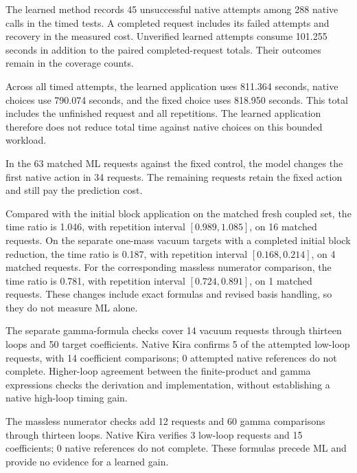 The learned method records 45 unsuccessful native attempts among 288 native calls in the timed tests. A completed request includes its failed attempts and recovery in the measured cost. Unverified learned attempts consume 101.255 seconds in addition to the paired completed-request totals. Their outcomes remain in the coverage counts.

Across all timed attempts, the learned application uses 811.364 seconds, native choices use 790.074 seconds, and the fixed choice uses 818.950 seconds. This total includes the unfinished request and all repetitions. The learned application therefore does not reduce total time against native choices on this bounded workload.

In the 63 matched ML requests against the fixed control, the model changes the first native action in 34 requests. The remaining requests retain the fixed action and still pay the prediction cost.

Compared with the initial block application on the matched fresh coupled set, the time ratio is 1.046, with repetition interval $[0.989,1.085]$, on 16 matched requests. On the separate one-mass vacuum targets with a completed initial block reduction, the time ratio is 0.187, with repetition interval $[0.168,0.214]$, on 4 matched requests. For the corresponding massless numerator comparison, the time ratio is 0.781, with repetition interval $[0.724,0.891]$, on 1 matched requests. These changes include exact formulas and revised basis handling, so they do not measure ML alone.

The separate gamma-formula checks cover 14 vacuum requests through thirteen loops and 50 target coefficients. Native Kira confirms 5 of the attempted low-loop requests, with 14 coefficient comparisons; 0 attempted native references do not complete. Higher-loop agreement between the finite-product and gamma expressions checks the derivation and implementation, without establishing a native high-loop timing gain.
\FloatBarrier

The massless numerator checks add 12 requests and 60 gamma comparisons through thirteen loops. Native Kira verifies 3 low-loop requests and 15 coefficients; 0 native references do not complete. These formulas precede ML and provide no evidence for a learned gain.
